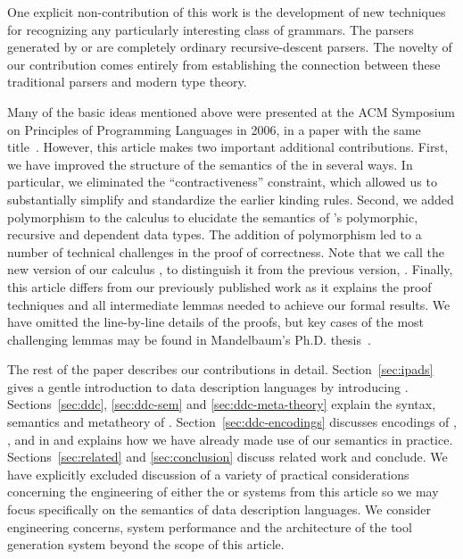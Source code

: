 One explicit non-contribution of this work is the development of new
techniques for recognizing any particularly interesting class of 
grammars.  The parsers generated by \ddc{} or \pads{} are completely ordinary
recursive-descent parsers.  The novelty of our contribution comes entirely
from establishing the connection between these traditional parsers and
modern type theory.

Many of the basic ideas mentioned above were presented at the ACM 
Symposium on Principles of Programming Languages in 2006,
in a paper with the same title~\cite{fisher+:popl06}.  However,
this article makes two important additional contributions.
First, we have improved the structure of the semantics of the
\ddc{} in several ways.  In particular,
we eliminated the ``contractiveness'' constraint, which
allowed us to substantially simplify and standardize the earlier
kinding rules. Second, we 
added polymorphism to the calculus to elucidate
the semantics of \padsml{}'s polymorphic, recursive and dependent
data types.  The addition of polymorphism led to
a number of technical challenges in the proof of correctness. Note that we call the new version of our calculus \ddc{}, to distinguish it from the previous version, \ddcold{}.
Finally, this article differs from our previously published work as 
it explains the proof techniques and all intermediate lemmas needed 
to achieve our formal results.  We have omitted the line-by-line 
details of the proofs, but key cases of the most challenging
lemmas may be found in
Mandelbaum's Ph.D. thesis~\cite{mandelbaum:thesis}.

The rest of the paper describes our contributions in detail.
Section~\ref{sec:ipads} gives a gentle introduction to data description
languages by introducing \ipads.  
Sections~\ref{sec:ddc}, \ref{sec:ddc-sem} and \ref{sec:ddc-meta-theory}
explain the syntax, semantics and metatheory of \ddc{}.
Section~\ref{sec:ddc-encodings} discusses encodings of \ipads{},
\padsml{}, \packettypes{}
and \datascript{} in \ddc{} and 
explains how we have already made use of our semantics in practice.  
Sections~\ref{sec:related} and 
\ref{sec:conclusion} discuss related work and conclude.
We have explicitly excluded discussion of a variety of practical 
considerations concerning the engineering of either the \padsc{} or \padsml{}
systems from this article so we may focus specifically on the semantics 
of data description languages.  We consider engineering concerns,
system performance and the architecture of the 
\pads{} tool generation system beyond the scope of this article.

